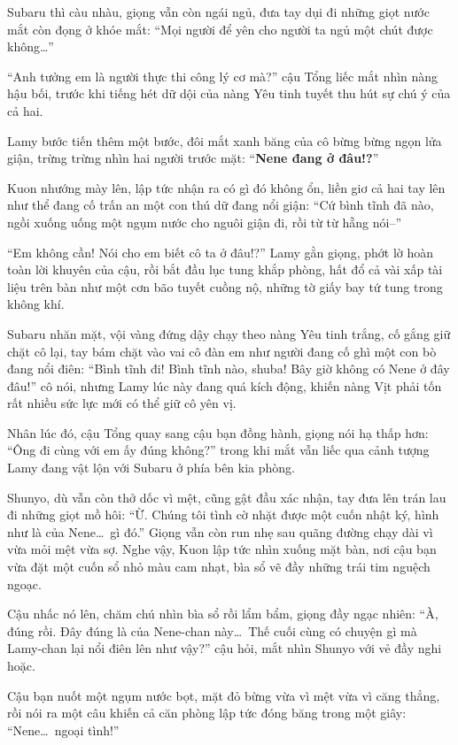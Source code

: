 \documentclass[../main.tex]{subfiles}
\begin{document}
Subaru thì càu nhàu, giọng vẫn còn ngái ngủ, đưa tay dụi đi những giọt nước mắt còn đọng ở khóe mắt: ``Mọi người để yên cho người ta ngủ một chút được không\dots''

``Anh tưởng em là người thực thi công lý cơ mà?'' cậu Tổng liếc mắt nhìn nàng hậu bối, trước khi tiếng hét dữ dội của nàng Yêu tinh tuyết thu hút sự chú ý của cả hai.

Lamy bước tiến thêm một bước, đôi mắt xanh băng của cô bừng bừng ngọn lửa giận, trừng trừng nhìn hai người trước mặt: ``\textbf{Nene đang ở đâu!?}''

Kuon nhướng mày lên, lập tức nhận ra có gì đó không ổn, liền giơ cả hai tay lên như thể đang cố trấn an một con thú dữ đang nổi giận: ``Cứ bình tĩnh đã nào, ngồi xuống uống một ngụm nước cho nguôi giận đi, rồi từ từ hẵng nói--''

``Em không cần! Nói cho em biết cô ta ở đâu!?'' Lamy gằn giọng, phớt lờ hoàn toàn lời khuyên của cậu, rồi bắt đầu lục tung khắp phòng, hất đổ cả vài xấp tài liệu trên bàn như một cơn bão tuyết cuồng nộ, những tờ giấy bay tứ tung trong không khí.

Subaru nhăn mặt, vội vàng đứng dậy chạy theo nàng Yêu tinh trắng, cố gắng giữ chặt cô lại, tay bám chặt vào vai cô đàn em như người đang cố ghì một con bò đang nổi điên: ``Bình tĩnh đi! Bình tĩnh nào, shuba! Bây giờ không có Nene ở đây đâu!'' cô nói, nhưng Lamy lúc này đang quá kích động, khiến nàng Vịt phải tốn rất nhiều sức lực mới có thể giữ cô yên vị.

Nhân lúc đó, cậu Tổng quay sang cậu bạn đồng hành, giọng nói hạ thấp hơn: ``Ông đi cùng với em ấy đúng không?'' trong khi mắt vẫn liếc qua cảnh tượng Lamy đang vật lộn với Subaru ở phía bên kia phòng.

Shunyo, dù vẫn còn thở dốc vì mệt, cũng gật đầu xác nhận, tay đưa lên trán lau đi những giọt mồ hôi: ``Ừ. Chúng tôi tình cờ nhặt được một cuốn nhật ký, hình như là của Nene\dots\ gì đó.'' Giọng vẫn còn run nhẹ sau quãng đường chạy dài vì vừa mỏi mệt vừa sợ. Nghe vậy, Kuon lập tức nhìn xuống mặt bàn, nơi cậu bạn vừa đặt một cuốn sổ nhỏ màu cam nhạt, bìa sổ vẽ đầy những trái tim nguệch ngoạc.

Cậu nhấc nó lên, chăm chú nhìn bìa sổ rồi lẩm bẩm, giọng đầy ngạc nhiên: ``À, đúng rồi. Đây đúng là của Nene-chan này\dots\ Thế cuối cùng có chuyện gì mà Lamy-chan lại nổi điên lên như vậy?'' cậu hỏi, mắt nhìn Shunyo với vẻ đầy nghi hoặc.

Cậu bạn nuốt một ngụm nước bọt, mặt đỏ bừng vừa vì mệt vừa vì căng thẳng, rồi nói ra một câu khiến cả căn phòng lập tức đóng băng trong một giây: ``Nene\dots\ ngoại tình!''
\end{document}

